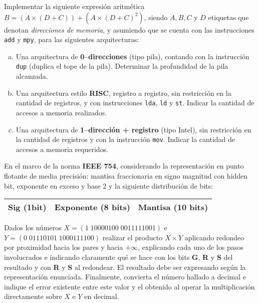 \documentclass[12pt,a4paper]{article}
\begin{document}

Implementar la siguiente expresión aritmética $B = (A \times (D + C))  + (A \times (D + C)^2)$, siendo $A, B, C$ y $D$ etiquetas que denotan \textit{direcciones de memoria}, y asumiendo que se cuenta con las instrucciones \texttt{add} y \texttt{mpy}, para las siguientes arquitecturas:
\begin{enumerate}[a)]
	\item Una arquitectura de \textbf{0--direcciones} (tipo pila), contando con la instrucción \texttt{dup} (duplica el tope de la pila). Determinar la profundidad de la pila alcanzada. 
	
	\item Una arquitectura estilo \textbf{RISC}, registro a registro, sin restricción en la cantidad de registros, y con instrucciones \texttt{lda}, \texttt{ld} y \texttt{st}. Indicar la cantidad de accesos a memoria realizados.
	
	\item Una arquitectura de \textbf{1--dirección + registro} (tipo Intel), sin restricción en la cantidad de registros y con la instrucción \texttt{mov}. Indicar la cantidad de accesos a memoria requeridos.	
\end{enumerate}

 En el marco de la norma \textbf{IEEE 754}, considerando la representación en punto flotante de media precisión: mantisa fraccionaria en signo magnitud con hidden bit, exponente en exceso y base 2 y la siguiente distribución de bits:
\begin{center}
	\begin{tabular}{|c|c|c|}\hline
		Sig (1bit) & Exponente (8 bits) & Mantisa (10 bits)\\\hline
	\end{tabular}
\end{center}

Dados los números $X = (1\; 10000100\; 0011111001)$ e $Y = (0\; 01110101 \; 1000111100)$ realizar el producto $X \times Y$ aplicando redondeo por proximidad hacia los pares y hacia $+\infty$, explicando cada uno de los pasos involucrados e indicando claramente qué se hace con los bits \textbf{G}, \textbf{R} y \textbf{S} del resultado y con \textbf{R} y \textbf{S} al redondear. El resultado debe ser expresando según la representación enunciada. Finalmente, convierta el número hallado a decimal e indique el error existente entre este valor y el obtenido al operar la multiplicación directamente sobre $X$ e $Y$ en decimal.
\end{document}
